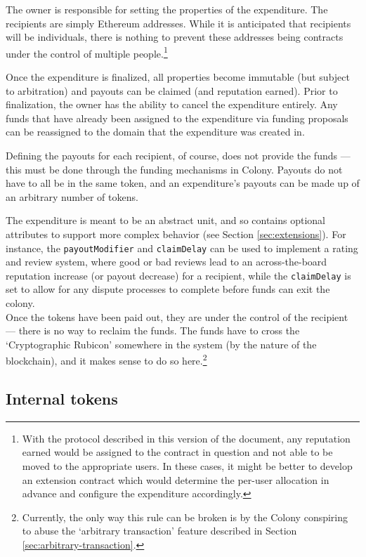 The owner is responsible for setting the properties of the expenditure. The recipients are simply Ethereum addresses. While it is anticipated that recipients will be individuals, there is nothing to prevent these addresses being contracts under the control of multiple people.\footnote{With the protocol described in this version of the document, any reputation earned would be assigned to the contract in question and not able to be moved to the appropriate users. In these cases, it might be better to develop an extension contract which would determine the per-user allocation in advance and configure the expenditure accordingly.}

Once the expenditure is finalized, all properties become immutable (but subject to arbitration) and payouts can be claimed (and reputation earned). Prior to finalization, the owner has the ability to cancel the expenditure entirely. Any funds that have already been assigned to the expenditure via funding proposals can be reassigned to the domain that the expenditure was created in.

Defining the payouts for each recipient, of course, does not provide the funds --- this must be done through the funding mechanisms in Colony. Payouts do not have to all be in the same token, and an expenditure's payouts can be made up of an arbitrary number of tokens.

The expenditure is meant to be an abstract unit, and so contains optional attributes to support more complex behavior (see Section \ref{sec:extensions}). For instance, the \texttt{payoutModifier} and \texttt{claimDelay} can be used to implement a rating and review system, where good or bad reviews lead to an across-the-board reputation increase (or payout decrease) for a recipient, while the \texttt{claimDelay} is set to allow for any dispute processes to complete before funds can exit the colony. \\

Once the tokens have been paid out, they are under the control of the recipient --- there is no way to reclaim the funds. The funds have to cross the `Cryptographic Rubicon' somewhere in the system (by the nature of the blockchain), and it makes sense to do so here.\footnote{Currently, the only way this rule can be broken is by the Colony conspiring to abuse the `arbitrary transaction' feature described in Section \ref{sec:arbitrary-transaction}.}

\subsection{Internal tokens}\label{sec:colony-tokens}

